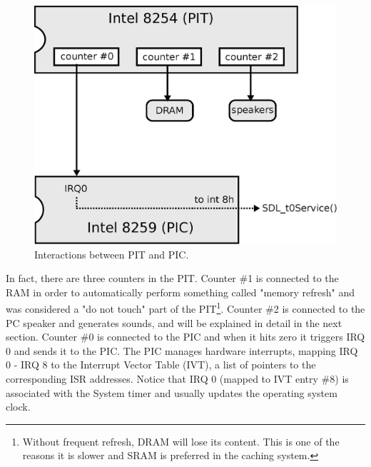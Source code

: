 \documentclass[book.tex]{subfiles}
\begin{document}
\par
\begin{figure}[H]
  \centering
  \includegraphics[width=.75\textwidth]{imgs/drawings/heartbeats.eps}
  \caption{Interactions between PIT and PIC.}
\end{figure}

\par
In fact, there are three counters in the PIT. Counter \#1 is connected to the RAM in order to automatically perform something called "memory refresh" and was considered a "do not touch" part of the PIT\footnote{Without frequent refresh, DRAM will lose its content. This is one of the reasons it is slower and SRAM is preferred in the caching system.}. Counter \#2 is connected to the PC speaker and generates sounds, and will be explained in detail in the next section. Counter \#0 is connected to the PIC and when it hits zero it triggers IRQ 0 and sends it to the PIC. The PIC manages hardware interrupts, mapping IRQ 0 - IRQ 8 to the Interrupt Vector Table (IVT), a list of pointers to the corresponding ISR addresses. Notice that IRQ 0 (mapped to IVT entry \#8) is associated with the System timer and usually updates the operating system clock.
\end{document}
